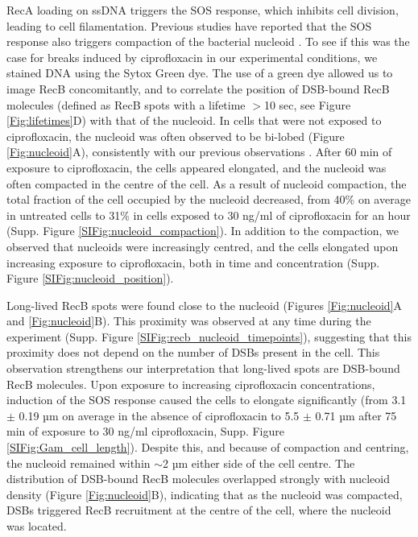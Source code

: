 RecA loading on ssDNA triggers the SOS response, which inhibits cell division, leading to cell filamentation. Previous studies have reported that the SOS response also triggers compaction of the bacterial nucleoid \cite{Odsbu2014}. To see if this was the case for breaks induced by ciprofloxacin in our experimental conditions, we stained DNA using the Sytox Green dye. The use of a green dye allowed us to image RecB concomitantly, and to correlate the position of DSB-bound RecB molecules (defined as RecB spots with a lifetime $>$10 sec, see Figure \ref{Fig:lifetimes}D) with that of the nucleoid. In cells that were not exposed to ciprofloxacin, the nucleoid was often observed to be bi-lobed (Figure \ref{Fig:nucleoid}A), consistently with our previous observations \cite{Lepore2023}. After 60 min of exposure to ciprofloxacin, the cells appeared elongated, and the nucleoid was often compacted in the centre of the cell. As a result of nucleoid compaction, the total fraction of the cell occupied by the nucleoid decreased, from 40\% on average in untreated cells to 31\% in cells exposed to 30 ng/ml of ciprofloxacin for an hour (Supp. Figure \ref{SIFig:nucleoid_compaction}). In addition to the compaction, we observed that nucleoids were increasingly centred, and the cells elongated upon increasing exposure to ciprofloxacin, both in time and concentration (Supp. Figure \ref{SIFig:nucleoid_position}).

Long-lived RecB spots were found close to the nucleoid (Figures \ref{Fig:nucleoid}A and \ref{Fig:nucleoid}B). This proximity was observed at any time during the experiment (Supp. Figure \ref{SIFig:recb_nucleoid_timepoints}), suggesting that this proximity does not depend on the number of DSBs present in the cell. This observation strengthens our interpretation that long-lived spots are DSB-bound RecB molecules. Upon exposure to increasing ciprofloxacin concentrations, induction of the SOS response caused the cells to elongate significantly (from 3.1 $\pm$ 0.19 µm on average in the absence of ciprofloxacin to 5.5 $\pm$ 0.71 µm after 75 min of exposure to 30 ng/ml ciprofloxacin, Supp. Figure \ref{SIFig:Gam_cell_length}). Despite this, and because of compaction and centring, the nucleoid remained within $\sim$2 µm either side of the cell centre. The distribution of DSB-bound RecB molecules overlapped strongly with nucleoid density (Figure \ref{Fig:nucleoid}B), indicating that as the nucleoid was compacted, DSBs triggered RecB recruitment at the centre of the cell, where the nucleoid was located.

